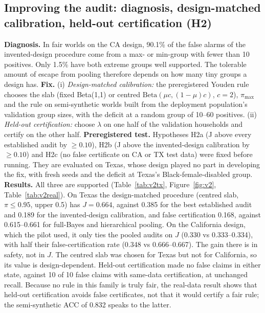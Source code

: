\documentclass[11pt]{article}
\begin{document}
\subsection{Improving the audit: diagnosis, design-matched calibration, held-out certification (H2)}
\textbf{Diagnosis.} In fair worlds on the CA design, 90.1\% of the false alarms of the invented-design procedure come from
a max- or min-group with fewer than 10 positives. Only 1.5\% have both extreme groups well supported. The tolerable amount
of escape from pooling therefore depends on how many tiny groups a design has.
\textbf{Fix.} (i) \emph{Design-matched calibration:} the preregistered Youden rule chooses the slab (fixed Beta(1,1) or
centred $\text{Beta}(\mu c,(1-\mu)c)$, $c=2$), $\pi_{\max}$ and the rule on semi-synthetic worlds built from the deployment
population's validation group sizes, with the deficit at a random group of 10--60 positives. (ii) \emph{Held-out
certification:} choose $\lambda$ on one half of the validation households and certify on the other half.
\textbf{Preregistered test.} Hypotheses H2a (J above every established audit by $\ge0.10$), H2b (J above the
invented-design calibration by $\ge0.10$) and H2c (no false certificate on CA or TX test data) were fixed before running.
They are evaluated on Texas, whose design played no part in developing the fix, with fresh seeds and the deficit at
Texas's Black-female-disabled group.
\textbf{Results.} All three are supported (Table~\ref{tab:v2tx}, Figure~\ref{fig:v2}, Table~\ref{tab:v2real}). On Texas the
design-matched procedure (centred slab, $\pi\le0.95$, upper 0.5) has $J=0.664$, against 0.385 for the best established
audit and 0.189 for the invented-design calibration, and false certification 0.168, against 0.615--0.661 for full-Bayes
and hierarchical pooling. On the California design, which the pilot used, it only ties the pooled audits on $J$ (0.330 vs
0.333--0.334), with half their false-certification rate (0.348 vs 0.666--0.667). The gain there is in safety, not in $J$.
The centred slab was chosen for Texas but not for California, so its value is design-dependent. Held-out certification
made no false claims in either state, against 10 of 10 false claims with same-data certification, at unchanged recall.
Because no rule in this family is truly fair, the real-data result shows that held-out certification avoids false
certificates, not that it would certify a fair rule; the semi-synthetic ACC of 0.832 speaks to the latter.
\end{document}
